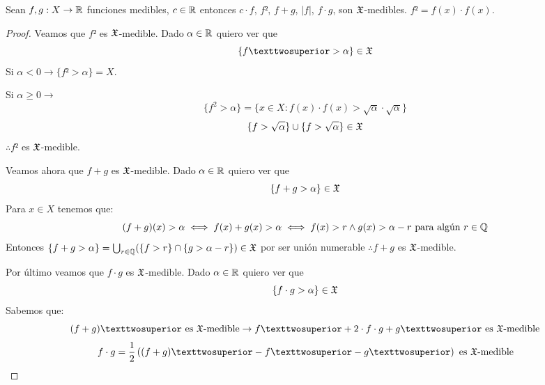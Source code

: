 \clearpage

\begin{lemma}
    Sean $f, g: X \to \mathbb{R}$ funciones medibles, $c \in \mathbb{R}$ entonces $c \cdot f$, $f²$, $f + g$, $|f|$, $f \cdot g$, son $\mathfrak{X}$-medibles.
    $f² = f(x) \cdot f(x)$.
    \begin{proof}
        Veamos que $f²$ es $\mathfrak{X}$-medible. Dado $\alpha \in \mathbb{R}$ quiero ver que \begin{equation}
            \{ f² > \alpha \} \in \mf{X}
        \end{equation}
        Si $\alpha < 0 \to \{ f² > \alpha \} = X$.

        Si $\alpha \geq 0 \to$
        \begin{equation}
            \{ f^2 > \alpha \} = \{ x \in X : f(x) \cdot f(x) > \sqrt{\alpha} \cdot \sqrt{\alpha} \}
        \end{equation}
        \begin{equation}
            \{ f > \sqrt{\alpha} \} \cup \{ f > \sqrt{\alpha} \} \in \mathfrak{X}
        \end{equation} $\therefore f²$ es $\mathfrak{X}$-medible.

        Veamos ahora que $f + g$ es $\mathfrak{X}$-medible. Dado $\alpha \in \mathbb{R}$ quiero ver que \begin{equation}
            \{ f + g > \alpha \} \in \mathfrak{X}
        \end{equation}
        Para $x \in X$ tenemos que: \begin{equation}
            (f+g)(x) > \alpha \iff f(x) + g(x) > \alpha \iff f(x) > r \land g(x) > \alpha - r \text{ para algún } r \in \mathbb{Q}
        \end{equation}
        Entonces $\{ f + g > \alpha \} = \bigcup_{r \in \mathbb{Q}} (\{ f > r \} \cap \{ g > \alpha - r \}) \in \mathfrak{X}$ por ser unión numerable $\therefore f+g$ es $\mathfrak{X}$-medible.

        Por último veamos que $f \cdot g$ es $\mathfrak{X}$-medible. Dado $\alpha \in \mathbb{R}$ quiero ver que \begin{equation}
            \{ f \cdot g > \alpha \} \in \mathfrak{X}
        \end{equation}
        Sabemos que:
        \begin{equation}
            (f+g)² \text{ es } \mf{X} \text{-medible} \to f² + 2 \cdot f \cdot g + g² \text{ es } \mf{X} \text{-medible}
        \end{equation}
        \begin{equation}
            f \cdot g = \frac{1}{2} \left( (f+g)² - f² - g² \right) \text{ es } \mf{X} \text{-medible}
        \end{equation}
    \end{proof}
\end{lemma}

